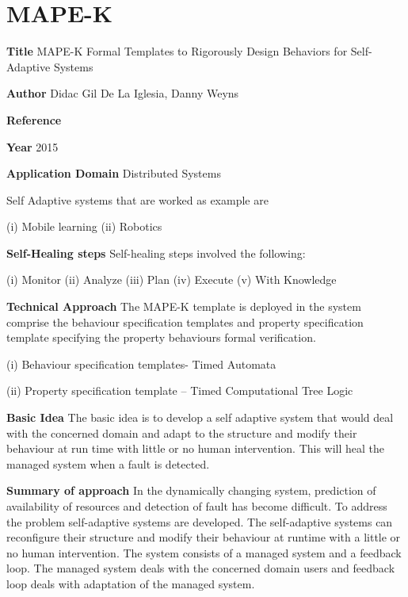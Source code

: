 \section{MAPE-K}\label{MAPE-K}
\begin{compactitem}

\item[\textbf{Title}]MAPE-K Formal Templates to Rigorously Design Behaviors for Self-Adaptive Systems

\item[\textbf{Author}]Didac Gil De La Iglesia, Danny Weyns

\item[\textbf{Reference}] 

\cite{didac_iglesia_mape-k:_2015}

\item[\textbf{Year}] 2015

\item[\textbf{Application Domain}]Distributed Systems 

Self Adaptive systems that are worked as example are

(i) Mobile learning (ii) Robotics

\item[\textbf{Self-Healing steps}] Self-healing steps   involved the following:

(i) Monitor (ii) Analyze (iii) Plan (iv) Execute 
(v) With Knowledge

\item[\textbf{Technical Approach}]
The MAPE-K template is deployed in the system comprise the behaviour specification templates and property specification template specifying the property behaviours formal verification.

(i) Behaviour specification templates- Timed Automata

(ii) Property specification template – Timed Computational Tree Logic

\item[\textbf{Basic Idea}]  
The basic idea is to develop a self adaptive system that would deal with the concerned domain and adapt to the structure and modify their behaviour at run time with little or no human intervention. This will heal the managed system when a fault is detected.


\item[\textbf{Summary of approach}] In the dynamically changing system, prediction of availability of resources and detection of fault has become difficult. To address the problem self-adaptive systems are developed. The self-adaptive systems can reconfigure their structure and modify their behaviour at runtime with a little or no human intervention. The system consists of a managed system and a feedback loop. The managed system deals with the concerned domain users and feedback loop deals with adaptation of the managed system.


\end{compactitem}
